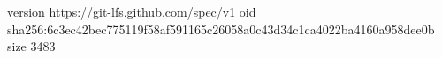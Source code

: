 version https://git-lfs.github.com/spec/v1
oid sha256:6c3ec42bec775119f58af591165c26058a0c43d34c1ca4022ba4160a958dee0b
size 3483

